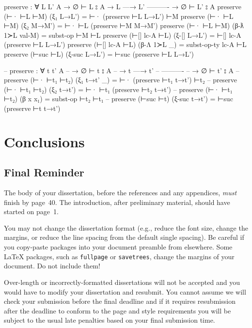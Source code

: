 \documentclass[logo,bsc,singlespacing,parskip,online]{infthesis}
\renewenvironment{code}{\mintedcopy[breaklines,breaksymbolleft=\;]{agda}}{\endmintedcopy}
\begin{document}
\begin{code}

  preserve : ∀ {L L' A}
    → ∅ ⊢ L ⦂ A
    → L —→ L'
      ----------
    → ∅ ⊢ L' ⦂ A
  preserve (⊢· ⊢L ⊢M) (ξ₁ L→L') = ⊢· (preserve ⊢L L→L') ⊢M
  preserve (⊢· ⊢L ⊢M) (ξ₂ M→M') = ⊢· ⊢L (preserve ⊢M M→M')
  preserve (⊢· ⊢L ⊢M) (β-ƛ 1≻L val-M) = subst-op ⊢M ⊢L
  preserve (⊢[] lc-A ⊢L) (ξ-[] L→L') = ⊢[] lc-A (preserve ⊢L L→L')
  preserve (⊢[] lc-A ⊢L) (β-Λ 1≻L _) = subst-op-ty lc-A ⊢L
  preserve (⊢suc ⊢L) (ξ-suc L→L') = ⊢suc (preserve ⊢L L→L')

  -- preserve : ∀ {t t' A}
  --   → ∅ ⊢ t ⦂ A
  --   → t —→ t'
  --     ----------
  --   → ∅ ⊢ t' ⦂ A
  -- preserve (⊢· ⊢t₁ ⊢t₂) (ξ₁ t→t' _) = ⊢· (preserve ⊢t₁ t→t') ⊢t₂
  -- preserve (⊢· ⊢t₁ ⊢t₂) (ξ₂ t→t') = ⊢· ⊢t₁  (preserve ⊢t₂ t→t')
  -- preserve (⊢· ⊢t₁ ⊢t₂) (β x x₁) = subst-op ⊢t₂ ⊢t₁
  -- preserve (⊢suc ⊢t) (ξ-suc t→t') = ⊢suc (preserve ⊢t t→t')
\end{code}

\chapter{Conclusions}

\section{Final Reminder}

The body of your dissertation, before the references and any appendices,
\emph{must} finish by page~40. The introduction, after preliminary material,
should have started on page~1.

You may not change the dissertation format (e.g., reduce the font size, change
the margins, or reduce the line spacing from the default single spacing). Be
careful if you copy-paste packages into your document preamble from elsewhere.
Some \LaTeX{} packages, such as \texttt{fullpage} or \texttt{savetrees}, change
the margins of your document. Do not include them!

Over-length or incorrectly-formatted dissertations will not be accepted and you
would have to modify your dissertation and resubmit. You cannot assume we will
check your submission before the final deadline and if it requires resubmission
after the deadline to conform to the page and style requirements you will be
subject to the usual late penalties based on your final submission time.



\end{document}
